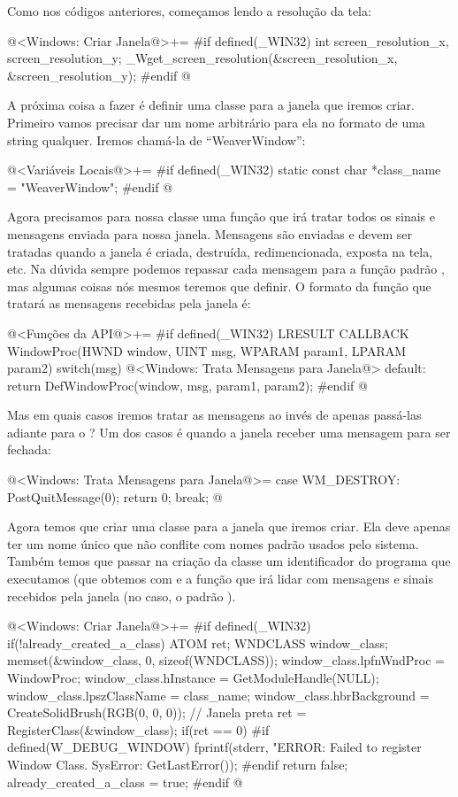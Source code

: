 Como nos códigos anteriores, começamos lendo a resolução da tela:

\iniciocodigo
@<Windows: Criar Janela@>+=
#if defined(_WIN32)
int screen_resolution_x, screen_resolution_y;
_Wget_screen_resolution(&screen_resolution_x, &screen_resolution_y);
#endif
@
\fimcodigo

A próxima coisa a fazer é definir uma classe para a janela que iremos
criar. Primeiro vamos precisar dar um nome arbitrário para ela no
formato de uma string qualquer. Iremos chamá-la de ``WeaverWindow'':

\iniciocodigo
@<Variáveis Locais@>+=
#if defined(_WIN32)
static const char *class_name = "WeaverWindow";
#endif
@
\fimcodigo

Agora precisamos para nossa classe uma função que irá tratar todos os
sinais e mensagens enviada para nossa janela. Mensagens são enviadas e
devem ser tratadas quando a janela é criada, destruída,
redimencionada, exposta na tela, etc. Na dúvida sempre podemos
repassar cada mensagem para a função
padrão , mas algumas coisas nós mesmos
teremos que definir. O formato da função que tratará as mensagens
recebidas pela janela é:

\iniciocodigo
@<Funções da API@>+=
#if defined(_WIN32)
LRESULT CALLBACK WindowProc(HWND window, UINT msg, WPARAM param1, LPARAM param2){
  switch(msg){
    @<Windows: Trata Mensagens para Janela@>
    default:
      return DefWindowProc(window, msg, param1, param2);
  }
}
#endif
@
\fimcodigo

Mas em quais casos iremos tratar as mensagens ao invés de apenas
passá-las adiante para o ? Um dos casos é
quando a janela receber uma mensagem para ser fechada:

\iniciocodigo
@<Windows: Trata Mensagens para Janela@>=
case WM_DESTROY:
  PostQuitMessage(0);
  return 0;
  break;
@
\fimcodigo

Agora temos que criar uma classe para a janela que iremos criar. Ela
deve apenas ter um nome único que não conflite com nomes padrão usados
pelo sistema. Também temos que passar na criação da classe um
identificador do programa que executamos (que obtemos
com  e a função que irá lidar com
mensagens e sinais recebidos pela janela (no
caso, o padrão ).

\iniciocodigo
@<Windows: Criar Janela@>+=
#if defined(_WIN32)
if(!already_created_a_class){
  ATOM ret;
  WNDCLASS window_class;
  memset(&window_class, 0, sizeof(WNDCLASS));
  window_class.lpfnWndProc = WindowProc;
  window_class.hInstance = GetModuleHandle(NULL);
  window_class.lpszClassName = class_name;
  window_class.hbrBackground = CreateSolidBrush(RGB(0, 0, 0)); // Janela preta
  ret = RegisterClass(&window_class);
  if(ret == 0){
#if defined(W_DEBUG_WINDOW)
    fprintf(stderr, "ERROR: Failed to register Window Class. SysError: %
            GetLastError());
#endif
    return false;
  }
  already_created_a_class = true;
}
#endif
@
\fimcodigo

